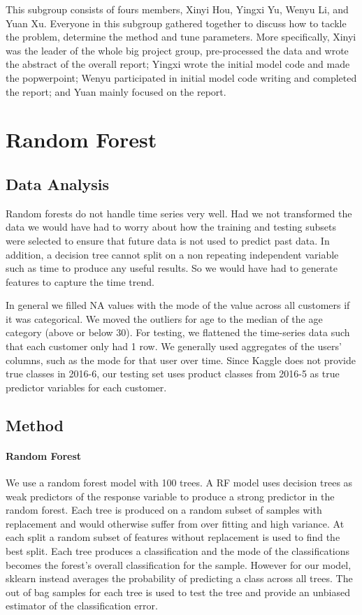 \documentclass{article}
\begin{document}
\begin{spacing}{1}
\begin{large}
This subgroup consists of fours members, Xinyi Hou, Yingxi Yu, Wenyu Li, and Yuan Xu. Everyone in this subgroup gathered together to discuss how to tackle the problem, determine the method and tune parameters. More specifically, Xinyi was the leader of the whole big project group, pre-processed the data and wrote the abstract of the overall report; Yingxi wrote the initial model code and made the popwerpoint; Wenyu participated in initial model code writing and completed the report; and Yuan mainly focused on the report.

\section{Random Forest}
	
\subsection{Data Analysis}

Random forests do not handle time series very well. Had we not transformed the data we would have had to worry about how the training and testing subsets were selected to ensure that future data is not used to predict past data. In addition, a decision tree cannot split on a non repeating independent variable such as time to produce any useful results. So we would have had to generate features to capture the time trend.

In general we filled NA values with the mode of the value across all customers if it was categorical. We moved the outliers for age to the median of the age category (above or below 30).
For testing, we flattened the time-series data such that each customer only had 1 row. We generally used aggregates of the users' columns, such as the mode for that user over time.
Since Kaggle does not provide true classes in 2016-6, our testing set uses product classes from 2016-5 as true predictor variables for each customer.

\subsection{Method}

\paragraph{Random Forest}
We use a random forest model with 100 trees. A RF model uses decision trees as weak predictors of the response variable to produce a strong predictor in the random forest. Each tree is produced on a random subset of samples with replacement and would otherwise suffer from over fitting and high variance. At each split a random subset of features without replacement is used to find the best split. Each tree produces a classification and the mode of the classifications becomes the forest's overall classification for the sample. However for our model, sklearn instead averages the probability of predicting a class across all trees.\cite{rnSKlearn}  The out of bag samples for each tree is used to test the tree and provide an unbiased estimator of the classification error.\cite{rnLeo}


\end{large}
\end{spacing}
\end{document}
